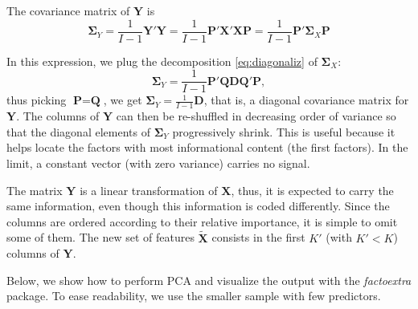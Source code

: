 \documentclass[]{krantz}
\makeatletter
\newenvironment{Shaded}{\begin{snugshade}}{\end{snugshade}}
\newcommand{\CommentTok}[1]{\textcolor[rgb]{0.37,0.37,0.37}{\textit{#1}}}
\newcommand{\KeywordTok}[1]{\textcolor[rgb]{0.27,0.27,0.27}{\textbf{#1}}}
\newcommand{\NormalTok}[1]{#1}
\newcommand{\OperatorTok}[1]{\textcolor[rgb]{0.43,0.43,0.43}{\textbf{#1}}}
\newcommand{\StringTok}[1]{\textcolor[rgb]{0.5,0.5,0.5}{#1}}
\newenvironment{kframe}{%
\medskip{}
\setlength{\fboxsep}{.8em}
 \def\at@end@of@kframe{}%
 \ifinner\ifhmode%
  \def\at@end@of@kframe{\end{minipage}}%
  \begin{minipage}{\columnwidth}%
 \fi\fi%
 \def\FrameCommand##1{\hskip\@totalleftmargin \hskip-\fboxsep
 \colorbox{shadecolor}{##1}\hskip-\fboxsep
     \hskip-\linewidth \hskip-\@totalleftmargin \hskip\columnwidth}%
 \MakeFramed {\advance\hsize-\width
   \@totalleftmargin\z@ \linewidth\hsize
   \@setminipage}}%
 {\par\unskip\endMakeFramed%
 \at@end@of@kframe}
\renewenvironment{Shaded}{\begin{kframe}}{\end{kframe}}
\theoremstyle{definition}
\theoremstyle{definition}
\theoremstyle{definition}
\theoremstyle{remark}
\makeatother
\begin{document}
The covariance matrix of \(\textbf{Y}\) is \begin{equation}
\label{eq:covy} 
\boldsymbol{\Sigma}_Y=\frac{1}{I-1}\textbf{Y}'\textbf{Y}=\frac{1}{I-1}\textbf{P}'\textbf{X}'\textbf{XP}=\frac{1}{I-1}\textbf{P}'\boldsymbol{\Sigma}_X\textbf{P}
\end{equation}

In this expression, we plug the decomposition \eqref{eq:diagonaliz} of
\(\boldsymbol{\Sigma}_X\):
\[\boldsymbol{\Sigma}_Y=\frac{1}{I-1}\textbf{P}'\textbf{Q}\textbf{DQ}'\textbf{P},\]
thus picking \(\textbf{P}=\textbf{Q}\), we get
\(\boldsymbol{\Sigma}_Y=\frac{1}{I-1}\textbf{D}\), that is, a diagonal
covariance matrix for \(\textbf{Y}\). The columns of \(\textbf{Y}\) can
then be re-shuffled in decreasing order of variance so that the diagonal
elements of \(\boldsymbol{\Sigma}_Y\) progressively shrink. This is
useful because it helps locate the factors with most informational
content (the first factors). In the limit, a constant vector (with zero
variance) carries no signal.

The matrix \(\textbf{Y}\) is a linear transformation of \(\textbf{X}\),
thus, it is expected to carry the same information, even though this
information is coded differently. Since the columns are ordered
according to their relative importance, it is simple to omit some of
them. The new set of features \(\tilde{\textbf{X}}\) consists in the
first \(K'\) (with \(K'<K\)) columns of \(\textbf{Y}\).

Below, we show how to perform PCA and visualize the output with the
\emph{factoextra} package. To ease readability, we use the smaller
sample with few predictors.

\footnotesize

\begin{Shaded}
\end{Shaded}
\end{document}
